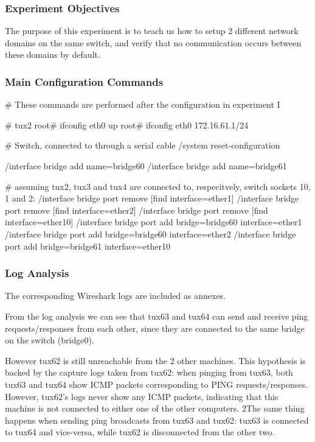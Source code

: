\documentclass[11pt,a4paper,twocolumn]{article}
\begin{document}
\subsubsection{Experiment Objectives}

The purpose of this experiment is to teach us how to setup 2 different network domains on the same switch, and verify that no communication occurs between these domains by default.

\subsubsection{Main Configuration Commands}

\begin{code-bash}
# These commands are performed after the configuration in experiment I

# tux2
root# ifconfig eth0 up
root# ifconfig eth0 172.16.61.1/24

# Switch, connected to through a serial cable
/system reset-configuration

/interface bridge add name=bridge60
/interface bridge add name=bridge61

# assuming tux2, tux3 and tux4 are connected to, respecitvely, switch sockets 10, 1 and 2:
/interface bridge port remove [find interface=ether1]
/interface bridge port remove [find interface=ether2]
/interface bridge port remove [find interface=ether10]
/interface bridge port add bridge=bridge60 interface=ether1
/interface bridge port add bridge=bridge60 interface=ether2
/interface bridge port add bridge=bridge61 interface=ether10
\end{code-bash}

\subsubsection{Log Analysis}

The corresponding Wireshark logs are included as annexes.

From the log analysis we can see that tux63 and tux64 can send and receive ping requests/responses from each other, since they are connected to the same bridge on the switch (bridge0).

However tux62 is still unreachable from the 2 other machines.
This hypothesis is backed by the capture logs taken from tux62: when pinging from tux63, both tux63 and tux64 show ICMP packets corresponding to PING requests/responses. However, tux62's logs never show any ICMP packets, indicating that this machine is not connected to either one of the other computers.
2The same thing happens when sending ping broadcasts from tux63 and tux62: tux63 is connected to tux64 and vice-versa, while tux62 is disconnected from the other two.
\end{document}
